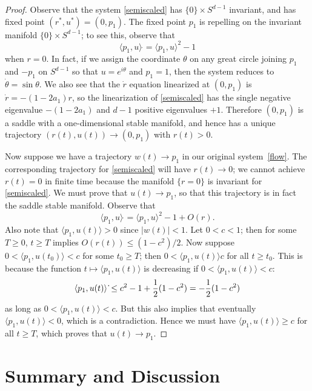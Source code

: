\documentclass[%
 aip,
 amsmath,amssymb,
 reprint,%
]{revtex4-1}
\begin{document}
\begin{proof}
Observe that the system \eqref{semiscaled} has $\{0\} \times S^{d-1} $ invariant, and has  fixed point $(r^\ast, u^\ast) = (0, p_1)$.  The fixed point $p_1$ is repelling on the invariant manifold $\{0\} \times S^{d-1} $; to see this, observe that
$$
 \langle p_1, u \rangle  \, \dot {} = \langle p_1, u \rangle ^2 - 1
$$
when $r = 0$.   In fact, if  we assign the coordinate $\theta$ on any great circle joining $p_1$ and $-p_1$ on $S^{d-1}$ so that $u = e^{i \theta}$ and $p_1 = 1$, then the system reduces to $\dot \theta = \sin \theta$.  We also see that the $\dot r$ equation linearized at $(0, p_1)$ is $\dot r =  -(1-2a_1)   r$, so the linearization of \eqref{semiscaled}  has the single negative eigenvalue $ -(1-2a_1)$ and $d-1$ positive eigenvalues $+1$.   Therefore  $(0, p_1)$ is a saddle with a one-dimensional stable manifold, and hence has a unique trajectory $(r(t), u(t)) \to (0, p_1)$ with $r(t) > 0$.
 
 Now suppose we have a trajectory $w(t) \to p_1$ in our original system~\eqref{flow}.  The corresponding trajectory for \eqref{semiscaled} will have $r(t) \to 0$; we cannot achieve $r(t) = 0$ in finite time because the manifold $\{ r = 0\}$ is invariant for \eqref{semiscaled}.  We must prove that $u(t) \to p_1$, so that this trajectory is in fact the saddle stable manifold.  Observe that
 $$
 \langle p_1, u \rangle  \, \dot {} = \langle p_1, u \rangle ^2 - 1 +O(r).
$$
Also note that $\langle p_1, u (t) \rangle > 0$ since $|w(t)| < 1$.   Let $0 < c < 1$; then for some $T \ge 0$, $t \ge T$ implies  $O(r(t)) \le ( 1-c^2)/2$.  Now suppose $0 < \langle p_1, u (t_0) \rangle < c$ for some $t_0 \ge T$; then $0 < \langle p_1, u (t) \rangle  c$ for all $t \ge t_0$. This is because the function $ t \mapsto \langle p_1, u (t) \rangle$ is decreasing if  $0 < \langle p_1, u (t) \rangle <  c$:
$$
 \langle p_1, u (t)  \rangle  \, \dot {} \le c^2 -1 +{1 \over 2} (1-c^2) = -\frac{1}{2}(1-c^2)
 $$
as long as $0 < \langle p_1, u (t) \rangle <  c$.  But this also implies that eventually $ \langle p_1, u (t)  \rangle  < 0$, which is a contradiction.  Hence we must have $  \langle p_1, u (t)  \rangle  \ge c$ for all $t \ge T$, which proves that $u(t) \to p_1$.
\end{proof}

\section{Summary and Discussion}
\end{document}
